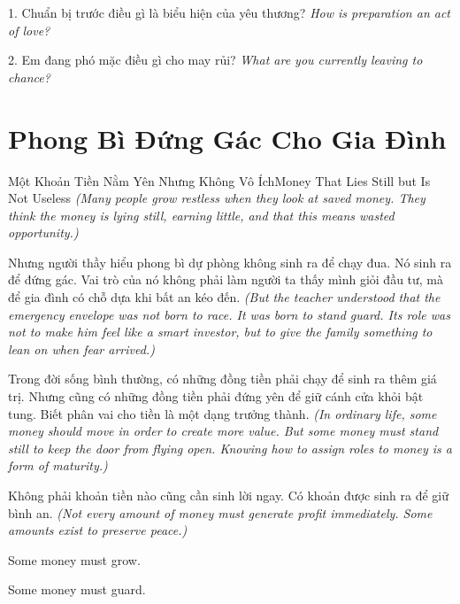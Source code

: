\begin{tuhocnhanh}
1. Chuẩn bị trước điều gì là biểu hiện của yêu thương? \textit{How is preparation an act of love?}

2. Em đang phó mặc điều gì cho may rủi? \textit{What are you currently leaving to chance?}
\end{tuhocnhanh}
\ngancach

\section{Phong Bì Đứng Gác Cho Gia Đình}
\begin{truyen}{Một Khoản Tiền Nằm Yên Nhưng Không Vô Ích}{Money That Lies Still but Is Not Useless}
\textit{(Many people grow restless when they look at saved money. They think the money is lying still, earning little, and that this means wasted opportunity.)}

Nhưng người thầy hiểu phong bì dự phòng không sinh ra để chạy đua. Nó sinh ra để đứng gác. Vai trò của nó không phải làm người ta thấy mình giỏi đầu tư, mà để gia đình có chỗ dựa khi bất an kéo đến.
\textit{(But the teacher understood that the emergency envelope was not born to race. It was born to stand guard. Its role was not to make him feel like a smart investor, but to give the family something to lean on when fear arrived.)}

Trong đời sống bình thường, có những đồng tiền phải chạy để sinh ra thêm giá trị. Nhưng cũng có những đồng tiền phải đứng yên để giữ cánh cửa khỏi bật tung. Biết phân vai cho tiền là một dạng trưởng thành.
\textit{(In ordinary life, some money should move in order to create more value. But some money must stand still to keep the door from flying open. Knowing how to assign roles to money is a form of maturity.)}
\end{truyen}

\begin{baihoc}
Không phải khoản tiền nào cũng cần sinh lời ngay. Có khoản được sinh ra để giữ bình an.
\textit{(Not every amount of money must generate profit immediately. Some amounts exist to preserve peace.)}
\end{baihoc}

\begin{ghinhoanh}
Some money must grow.

Some money must guard.
\end{ghinhoanh}

